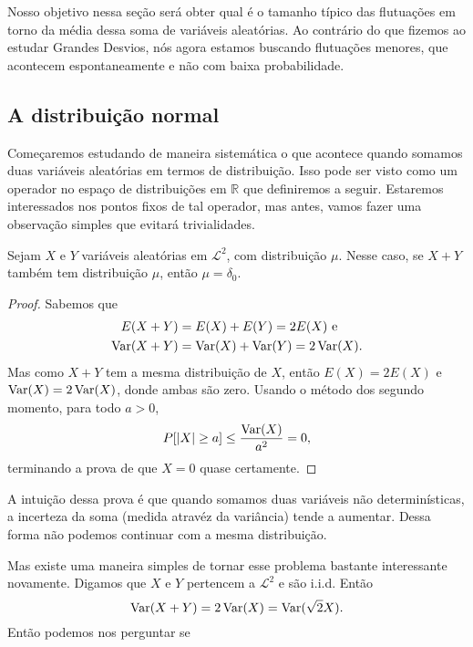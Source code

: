 Nosso objetivo nessa seção será obter qual é o tamanho típico das flutuações em torno da média dessa soma de variáveis aleatórias.
Ao contrário do que fizemos ao estudar Grandes Desvios, nós agora estamos buscando flutuações menores, que acontecem espontaneamente e não com baixa probabilidade.

\subsection{A distribuição normal}

Começaremos estudando de maneira sistemática o que acontece quando somamos duas variáveis aleatórias \iid em termos de distribuição.
Isso pode ser visto como um operador no espaço de distribuições em $\mathbb{R}$ que definiremos a seguir.
Estaremos interessados nos pontos fixos de tal operador, mas antes, vamos fazer uma observação simples que evitará trivialidades.

\begin{lemma}
  Sejam $X$ e $Y$ variáveis aleatórias em $\mathcal{L}^2$, \iid com distribuição $\mu$.
  Nesse caso, se $X + Y$ também tem distribuição $\mu$, então $\mu = \delta_0$.
\end{lemma}

\begin{proof}
  Sabemos que
  \begin{equation}
    \begin{split}
      E(X + Y) & = E(X) + E(Y) = 2 E(X) \text{ e}\\
      \operatorname{Var}(X + Y) & = \operatorname{Var}(X) + \operatorname{Var}(Y) = 2 \operatorname{Var}(X).
    \end{split}
  \end{equation}
  Mas como $X + Y$ tem a mesma distribuição de $X$, então $E(X) = 2 E(X)$ e $\operatorname{Var}(X) = 2 \operatorname{Var}(X)$, donde ambas são zero.
  Usando o método dos segundo momento, para todo $a > 0$,
  \begin{equation}
    P[|X| \geq a] \leq \frac{\operatorname{Var}(X)}{a^2} = 0,
  \end{equation}
  terminando a prova de que $X = 0$ quase certamente.
\end{proof}

A intuição dessa prova é que quando somamos duas variáveis não determinísticas, a incerteza da soma (medida atravéz da variância) tende a aumentar.
Dessa forma não podemos continuar com a mesma distribuição.

Mas existe uma maneira simples de tornar esse problema bastante interessante novamente.
Digamos que $X$ e $Y$ pertencem a $\mathcal{L}^2$ e são i.i.d.
Então
\begin{equation}
  \operatorname{Var}(X + Y) = 2 \operatorname{Var}(X) = \operatorname{Var}(\sqrt{2} X).
\end{equation}
Então podemos nos perguntar se

